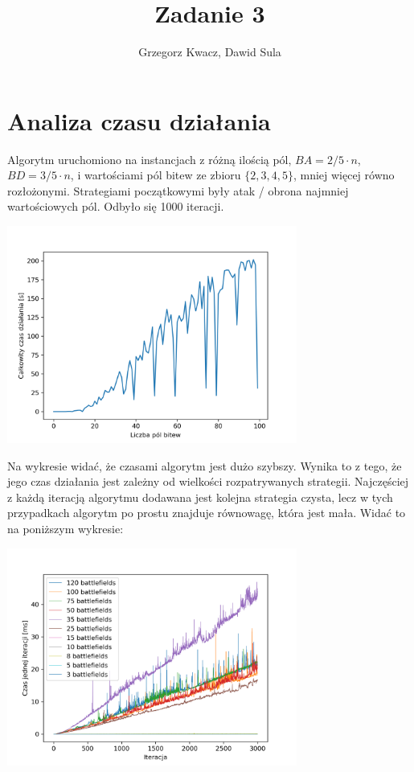 \documentclass{article}
\title{Zadanie 3}
\author{Grzegorz Kwacz, Dawid Sula}
\date{}
\begin{document}
\maketitle

\section{Analiza czasu działania}

Algorytm uruchomiono na instancjach z różną ilością pól, $BA = 2/5 \cdot n$,
$BD = 3/5 \cdot n$, i wartościami pól bitew ze zbioru $\{2,3,4,5\}$, mniej
więcej równo rozłożonymi. Strategiami początkowymi były atak / obrona najmniej
wartościowych pól. Odbyło się 1000 iteracji.

\begin{center}
\includegraphics[width=360px]{./results/time_per_battlefields.png}
\end{center}

Na wykresie widać, że czasami algorytm jest dużo szybszy. Wynika to z tego, że
jego czas działania jest zależny od wielkości rozpatrywanych strategii.
Najczęściej z każdą iteracją algorytmu dodawana jest kolejna strategia czysta,
lecz w tych przypadkach algorytm po prostu znajduje równowagę, która jest mała.
Widać to na poniższym wykresie:

\begin{center}
\includegraphics[width=360px]{./results/time_per_step.png}
\end{center}
\end{document}
